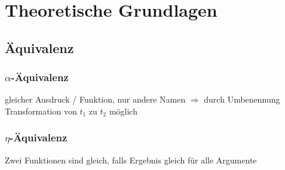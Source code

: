 \chapter{Theoretische Grundlagen}
\section{Äquivalenz}
\subsection{$\alpha$-Äquivalenz }
gleicher Ausdruck / Funktion, nur andere Namen $\Rightarrow$ durch Umbenennung Transformation von $t_1$ zu $t_2$ möglich

\subsection{$\eta$-Äquivalenz }
Zwei Funktionen sind gleich, falls Ergebnis gleich für alle Argumente

